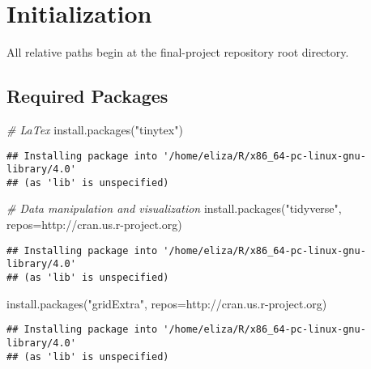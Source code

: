 \documentclass[
]{article}
\newenvironment{Shaded}{\begin{snugshade}}{\end{snugshade}}
\newcommand{\AttributeTok}[1]{\textcolor[rgb]{0.77,0.63,0.00}{#1}}
\newcommand{\CommentTok}[1]{\textcolor[rgb]{0.56,0.35,0.01}{\textit{#1}}}
\newcommand{\FunctionTok}[1]{\textcolor[rgb]{0.00,0.00,0.00}{#1}}
\newcommand{\NormalTok}[1]{#1}
\newcommand{\StringTok}[1]{\textcolor[rgb]{0.31,0.60,0.02}{#1}}
\begin{document}
\hypertarget{initialization}{%
\section{Initialization}\label{initialization}}

All relative paths begin at the final-project repository root directory.

\hypertarget{required-packages}{%
\subsection{Required Packages}\label{required-packages}}

\begin{Shaded}
\begin{Highlighting}[]
\CommentTok{\# LaTex}
\FunctionTok{install.packages}\NormalTok{(}\StringTok{"tinytex"}\NormalTok{)}
\end{Highlighting}
\end{Shaded}

\begin{verbatim}
## Installing package into '/home/eliza/R/x86_64-pc-linux-gnu-library/4.0'
## (as 'lib' is unspecified)
\end{verbatim}

\begin{Shaded}
\begin{Highlighting}[]
\CommentTok{\# Data manipulation and visualization}
\FunctionTok{install.packages}\NormalTok{(}\StringTok{"tidyverse"}\NormalTok{, }\AttributeTok{repos=}\StringTok{\textquotesingle{}http://cran.us.r{-}project.org\textquotesingle{}}\NormalTok{)}
\end{Highlighting}
\end{Shaded}

\begin{verbatim}
## Installing package into '/home/eliza/R/x86_64-pc-linux-gnu-library/4.0'
## (as 'lib' is unspecified)
\end{verbatim}

\begin{Shaded}
\begin{Highlighting}[]
\FunctionTok{install.packages}\NormalTok{(}\StringTok{"gridExtra"}\NormalTok{, }\AttributeTok{repos=}\StringTok{\textquotesingle{}http://cran.us.r{-}project.org\textquotesingle{}}\NormalTok{)}
\end{Highlighting}
\end{Shaded}

\begin{verbatim}
## Installing package into '/home/eliza/R/x86_64-pc-linux-gnu-library/4.0'
## (as 'lib' is unspecified)
\end{verbatim}
\end{document}

